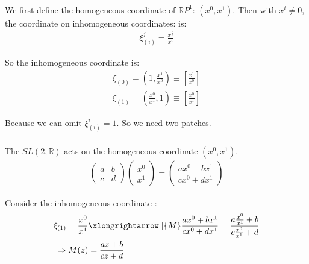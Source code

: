 \documentclass[]{ctexart}
\begin{document}
		\subsubsection{}
			We first define the homogeneous coordinate of $\mathbb{R}P^1$: $(x^0,x^1)$. Then with $x^i\neq 0$, the coordinate on inhomogeneous coordinates: is:
				\begin{equation*}
				\begin{aligned}
					\xi ^j_{(i)}=\frac{x^j}{x^i}
				\end{aligned}
				\end{equation*}
			
			So the inhomogeneous coordinate is:
				\begin{equation*}
				\begin{aligned}
					\xi_{(0)}=(1,\frac{x^1}{x^0})\equiv \left[\frac{x^1}{x^0}\right]\\
					\xi_{(1)}=(\frac{x^0}{x^1},1)\equiv \left[\frac{x^0}{x^1}\right]
				\end{aligned}
				\end{equation*}
				
			 Because we can omit $\xi ^i_{(i)}=1$. So we need two patches.
			
		\subsubsection{}
			The $SL(2,\mathbb{R})$ acts on the homogeneous coordinate $(x^0,x^1)$. 
				\begin{equation*}
				\begin{aligned}
					\begin{pmatrix}
						a & b\\
						c & d
					\end{pmatrix}
					\begin{pmatrix}
						x^0\\
						x^1
					\end{pmatrix}
					=
					\begin{pmatrix}
						ax^0+bx^1\\
						cx^0+dx^1
					\end{pmatrix}
				\end{aligned}
				\end{equation*}
				
			Consider the inhomogeneous coordinate :
				\begin{equation*}
				\begin{aligned}
					\xi_{(1)}=\frac{x^0}{x^1}&\xlongrightarrow[]{M} \frac{ax^0+bx^1}{cx^0+dx^1}=\frac{a\frac{x^0}{x^1}+b}{c\frac{x^0}{x^1}+d}\\
					\Rightarrow M(z)&=\frac{az+b}{cz+d}
				\end{aligned}
				\end{equation*}
			
\end{document}
